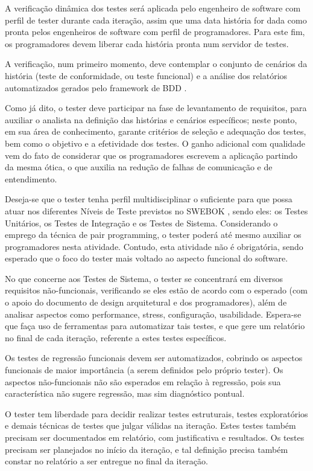 \documentclass[12pt,journal,compsoc]{IEEEtran}
\begin{document}
A verificação dinâmica dos testes será aplicada pelo engenheiro de software com perfil de tester durante cada iteração, assim que uma data história for dada como pronta pelos engenheiros de software com perfil de programadores. Para este fim, os programadores devem liberar cada história pronta num servidor de testes.

A verificação, num primeiro momento, deve contemplar o conjunto de cenários da
história (teste de conformidade, ou teste funcional) e a análise dos relatórios
automatizados gerados pelo framework de BDD \cite{chelimsky2010rspec}.

Como já dito, o tester deve participar na fase de levantamento de requisitos, para auxiliar o analista na definição das histórias e cenários específicos; neste ponto, em sua área de conhecimento, garante critérios de seleção e adequação dos testes, bem como o objetivo e a efetividade dos testes. O ganho adicional com qualidade vem do fato de considerar que os programadores escrevem a aplicação partindo da mesma ótica, o que auxilia na redução de falhas de comunicação e de entendimento.

Deseja-se que o tester tenha perfil multidisciplinar o suficiente para que
possa atuar nos diferentes Níveis de Teste previstos no SWEBOK
\cite{society_software_2004}, sendo eles: os Testes Unitários, os Testes de
Integração e os Testes de Sistema. Considerando o emprego da técnica de pair
programming, o tester poderá até mesmo auxiliar os programadores nesta
atividade.  Contudo, esta atividade não é obrigatória, sendo esperado que o
foco do tester mais voltado ao aspecto funcional do software. 

No que concerne aos Testes de Sistema, o tester se concentrará em diversos
requisitos não-funcionais, verificando se eles estão de acordo com o esperado
(com o apoio do documento de design arquitetural e dos programadores), além de
analisar aspectos como performance, stress, configuração, usabilidade.
Espera-se que faça uso de  ferramentas para automatizar tais testes, e que gere
um relatório no final de cada iteração, referente a estes testes específicos.

Os testes de regressão funcionais devem ser automatizados, cobrindo os aspectos funcionais de maior importância (a serem definidos pelo próprio tester). Os aspectos não-funcionais não são esperados em relação à regressão, pois sua característica não sugere regressão, mas sim diagnóstico pontual.

O tester tem liberdade para decidir realizar testes estruturais, testes exploratórios e demais técnicas de testes que julgar válidas na iteração. Estes testes também precisam ser documentados em relatório, com justificativa e resultados. Os testes precisam ser planejados no início da iteração, e tal definição precisa também constar no relatório a ser entregue no final da iteração.
\end{document}
